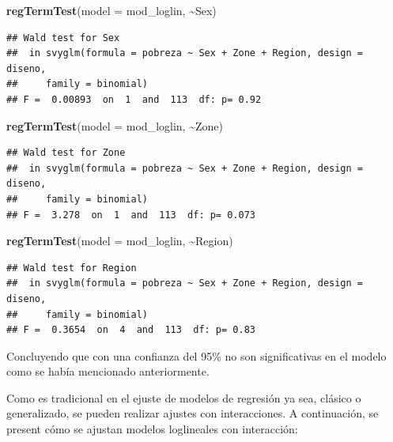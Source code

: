 \documentclass[
  spanish,
  12pt,
]{book}
\newenvironment{Shaded}{\begin{snugshade}}{\end{snugshade}}
\newcommand{\AttributeTok}[1]{\textcolor[rgb]{0.13,0.29,0.53}{#1}}
\newcommand{\FunctionTok}[1]{\textcolor[rgb]{0.13,0.29,0.53}{\textbf{#1}}}
\newcommand{\NormalTok}[1]{#1}
\newcommand{\SpecialCharTok}[1]{\textcolor[rgb]{0.81,0.36,0.00}{\textbf{#1}}}
\begin{document}
\begin{Shaded}
\begin{Highlighting}[]
  \FunctionTok{regTermTest}\NormalTok{(}\AttributeTok{model =}\NormalTok{ mod\_loglin, }\SpecialCharTok{\textasciitilde{}}\NormalTok{Sex)}
\end{Highlighting}
\end{Shaded}

\begin{verbatim}
## Wald test for Sex
##  in svyglm(formula = pobreza ~ Sex + Zone + Region, design = diseno, 
##     family = binomial)
## F =  0.00893  on  1  and  113  df: p= 0.92
\end{verbatim}

\begin{Shaded}
\begin{Highlighting}[]
  \FunctionTok{regTermTest}\NormalTok{(}\AttributeTok{model =}\NormalTok{ mod\_loglin, }\SpecialCharTok{\textasciitilde{}}\NormalTok{Zone)}
\end{Highlighting}
\end{Shaded}

\begin{verbatim}
## Wald test for Zone
##  in svyglm(formula = pobreza ~ Sex + Zone + Region, design = diseno, 
##     family = binomial)
## F =  3.278  on  1  and  113  df: p= 0.073
\end{verbatim}

\begin{Shaded}
\begin{Highlighting}[]
  \FunctionTok{regTermTest}\NormalTok{(}\AttributeTok{model =}\NormalTok{ mod\_loglin, }\SpecialCharTok{\textasciitilde{}}\NormalTok{Region)}
\end{Highlighting}
\end{Shaded}

\begin{verbatim}
## Wald test for Region
##  in svyglm(formula = pobreza ~ Sex + Zone + Region, design = diseno, 
##     family = binomial)
## F =  0.3654  on  4  and  113  df: p= 0.83
\end{verbatim}

Concluyendo que con una confianza del 95\% no son significativas en el modelo como se había mencionado anteriormente.

Como es tradicional en el ejuste de modelos de regresión ya sea, clásico o generalizado, se pueden realizar ajustes con interacciones. A continuación, se present cómo se ajustan modelos loglineales con interacción:
\end{document}
